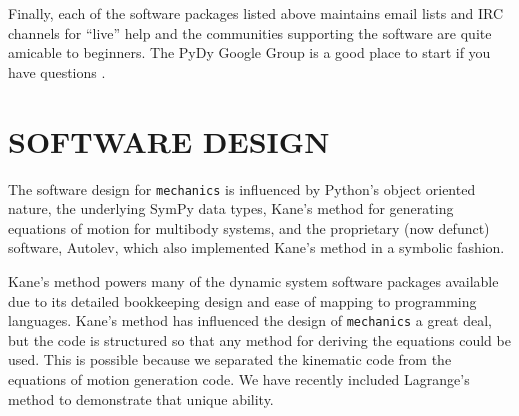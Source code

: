 \documentclass[twocolumn,10pt]{asme2e}
\begin{document}
Finally, each of the software packages listed above maintains email lists and
IRC channels for ``live'' help and the communities supporting the software are
quite amicable to beginners. The PyDy Google Group is a good place to start if
you have questions \cite{PyDyGoogleGroup}.
%
\section*{SOFTWARE DESIGN}
The software design for \verb|mechanics| is influenced by Python's object
oriented nature, the underlying SymPy data types, Kane's method for generating
equations of motion\cite{Kane1985} for multibody systems, and the proprietary
(now defunct) software, Autolev\cite{Kane2000}, which also implemented Kane's
method in a symbolic fashion.

Kane's method powers many of the dynamic system software packages available
\cite{Sayers1990, Enlighten2013} due to its detailed bookkeeping design and
ease of mapping to programming languages. Kane's method  has influenced the
design of \verb|mechanics| a great deal, but the code is structured so that any
method for deriving the equations could be used.  This is possible because we
separated the kinematic code from the equations of motion generation code. We
have recently included Lagrange’s method to demonstrate that unique ability.
\end{document}
